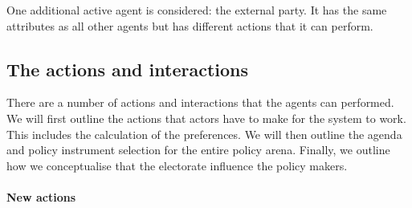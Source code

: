 \documentclass[11pt]{article}
\begin{document}
One additional active agent is considered: the external party. It has the same attributes as all other agents but has different actions that it can perform.



\subsection{The actions and interactions}


There are a number of actions and interactions that the agents can performed. We will first outline the actions that actors have to make for the system to work. This includes the calculation of the preferences. We will then outline the agenda and policy instrument selection for the entire policy arena. Finally, we outline how we conceptualise that the electorate influence the policy makers.

\paragraph{New actions}





\appendix


 

\end{document}
